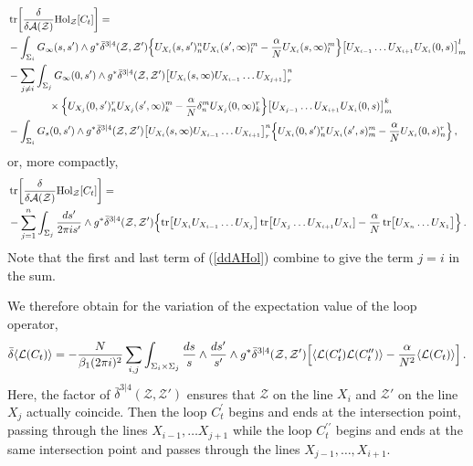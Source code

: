 \documentclass[12pt]{article}
\def \be  {\begin{equation}}
\def \ee  {\end{equation}}
\def \tr {\mathop{\rm tr}\nolimits}
\numberwithin{equation}{section}
\begin{document}
\begin{align}
\label{ddAHol}
&\tr \biggl[   \frac{\delta}{\delta \mathcal{A}(\mathcal{Z})}{\rm Hol}_{\mathcal{Z}}[C_t]\biggr] =  \\
& -\int_{\Sigma_i} G_{\infty}(s,s') \wedge g^* \bar{\delta}^{3|4}(\mathcal{Z},\mathcal{Z'}) \Bigl\{U_{X_i}(s,s')^n_n  U_{X_i}(s',\infty)^m_l -\frac{\alpha}{N} U_{X_i}(s,\infty)^m_l \Bigr\}\bigl[U_{X_{i-1}} \ldots U_{X_{i+1}} U_{X_i}(0,s)\bigr]^l_m \notag \\
& -\sum_{j \neq i}\int_{\Sigma_j} G_{\infty}(0,s') \wedge g^* \bar{\delta}^{3|4}(\mathcal{Z},\mathcal{Z'}) \bigl[ U_{X_i}(s,\infty) U_{X_{i-1}}\ldots U_{X_{j+1}}\bigr]^n_r  \notag \\
&\qquad \qquad  \times \Bigl\{U_{X_j}(0,s')^r_n  U_{X_j}(s',\infty)^m_k -\frac{\alpha}{N} \delta^{m}_{n} U_{X_j}(0,\infty)^r_k \Bigr\}\bigl[U_{X_{j-1}} \ldots U_{X_{i+1}} U_{X_i}(0,s)\bigr]^k_m \notag \\
& -\int_{\Sigma_i} G_{s}(0,s') \wedge g^* \bar{\delta}^{3|4}(\mathcal{Z},\mathcal{Z'}) \bigl[U_{X_i}(s,\infty) U_{X_{i-1}} \ldots U_{X_{i+1}}\bigr]^n_r \Bigl\{U_{X_i}(0,s')^r_n  U_{X_i}(s',s)^m_m -\frac{\alpha}{N} U_{X_i}(0,s)^r_n \Bigr\} \notag\,,
\end{align}
or, more compactly,
\begin{align}
&\tr \biggl[   \frac{\delta}{\delta \mathcal{A}(\mathcal{Z})}{\rm Hol}_{\mathcal{Z}}[C_t]\biggr] = \\
&-\sum_{j=1}^n \int_{\Sigma_j} \frac{ds'}{2 \pi i s'} \wedge g^*\bar{\delta}^{3|4}(\mathcal{Z},\mathcal{Z'})  
\Bigl\{\tr \bigl[U_{X_i} U_{X_{i-1}} \ldots U_{X_j} \bigr] \tr \bigl[U_{X_j} \ldots U_{X_{i+1}}U_{X_i}] -\frac{\alpha}{N} \tr \bigl[U_{X_n} \ldots U_{X_1}\bigr] \Bigr\}\,. \notag
\end{align}
Note that the first and last term of (\ref{ddAHol}) combine to give the term $j=i$ in the sum.

We therefore obtain for the variation of the expectation value of the loop operator,
\be
\bar{\delta} \langle \mathcal{L}(C_t)\rangle = -\frac{N}{\beta_1 (2 \pi i)^2} \sum_{i,j} \int_{\Sigma_i \times \Sigma_j} \frac{ds}{s} \wedge\frac{ds'}{s'} \wedge g^* \bar{\delta}^{3|4}(\mathcal{Z},\mathcal{Z'})  \Bigl[ \langle \mathcal{L}(C^\prime_t) \mathcal{L}(C^{\prime \prime}_t) \rangle - \frac{\alpha}{N^2} \langle \mathcal{L}(C_t)\rangle\Bigr]\,.
\label{loopeqs}
\ee
Here, the factor of $\bar{\delta}^{3|4}(\mathcal{Z},\mathcal{Z}')$ ensures that $\mathcal{Z}$ on the line $X_i$ and $\mathcal{Z}'$ on the line $X_j$ actually coincide. Then the loop $C^{\prime}_t$ begins and ends at the intersection point, passing through the lines $X_{i-1},\ldots X_{j+1}$ while the loop $C^{\prime \prime}_t$ begins and ends at the same intersection point and passes through the lines $X_{j-1},\ldots,X_{i+1}$.
\end{document}
